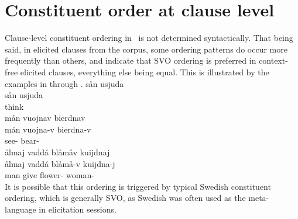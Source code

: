 \section{Constituent order at clause level}\label{constituentOrderClauses}
Clause-level constituent ordering in \PS\ is not determined syntactically. 
That being said, in elicited clauses from the corpus, some ordering patterns do occur more frequently than others, and indicate that SVO ordering is preferred in context-free elicited clauses, everything else being equal. 
This is illustrated by the examples in  through . 
\ea\label{standardConstOrder1}%
\glll	sån usjuda\\
	sån usjuda\\
	 think\BS{} \\\nopagebreak
{} 
\z
\ea\label{standardConstOrder2}%
\glll	mån vuojnav bierdnav\\
	mån vuojna-v bierdna-v\\
	 see- bear- \\\nopagebreak
{} 
\z
\ea\label{standardConstOrder3}%
\glll	ålmaj vaddá blåmåv kuijdnaj\\
	ålmaj vaddá blåmå-v kuijdna-j\\
	man\BS{} give\BS{} flower- woman-\\\nopagebreak
{} 
\z
It is possible that this ordering is triggered by typical Swedish constituent ordering, which is generally SVO, as Swedish was often used as the meta-language in elicitation sessions. 

